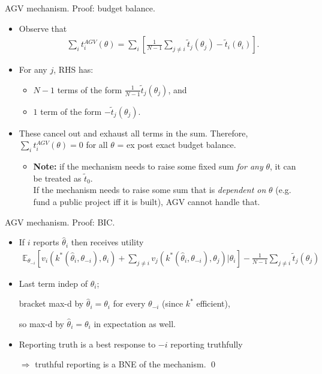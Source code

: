 \documentclass[english,10pt
,aspectratio=169
]{beamer}
\begin{document}
\begin{frame}{AGV mechanism. Proof: budget balance.}
\begin{itemize}
	\item Observe that
	\vspace{-0.5em}\begin{align*}
		\sum_i t_i^{AGV} (\theta) = \sum_i \left[ \frac{1}{N-1} \sum_{j \neq i} \tilde{t}_j (\theta_j) - \tilde{t}_i (\theta_i) \right].
	\end{align*}
	\item For any $j$, RHS has:
	\begin{itemize}
		\item $N-1$ terms of the form $\frac{1}{N-1} \tilde{t}_j (\theta_j)$, and
		\item $1$ term of the form $-\tilde{t}_j(\theta_j)$.
	\end{itemize}
	\item These cancel out and exhaust all terms in the sum. Therefore, $\sum_i t_i^{AGV} (\theta) = 0$ for all $\theta$ = ex post exact budget balance.
	\begin{itemize}
		\item \textbf{Note:} if the mechanism needs to raise some fixed sum \emph{for any} $\theta$, it can be treated as $\tilde{t}_0$. \\
		If the mechanism needs to raise some sum that is \emph{dependent on} $\theta$ (e.g. fund a public project iff it is built), AGV \alert{cannot} handle that.
	\end{itemize}
\end{itemize}
\end{frame}


\begin{frame}{AGV mechanism. Proof: BIC.}
\begin{itemize}
	\item If $i$ reports $\hat{\theta}_i$ then receives utility
	{\footnotesize 
		\vspace{-0.5em}\begin{align*}
			\mathbb{E}_{\theta_{-i}} \left[ v_i(k^*(\hat{\theta}_i, \theta_{-i}), \theta_i) + \sum_{j \neq i} v_j(k^*(\hat{\theta}_i, \theta_{-i}), \theta_j) | \theta_i \right] - \frac{1}{N-1} \sum_{j \neq i} \tilde{t}_j (\theta_j)
		\end{align*}
	}
	\item Last term indep of $\hat{\theta}_i$; 
	
	bracket max-d by $\hat{\theta}_i = \theta_i$ for every $\theta_{-i}$ (since $k^*$ efficient), 
	
	so max-d by $\hat{\theta}_i = \theta_i$ in expectation as well.
	
	\item Reporting truth is a best response to $-i$ reporting truthfully 
	
	$\Rightarrow$ truthful reporting is a BNE of the mechanism. \qed
\end{itemize}
\end{frame}
\end{document}
